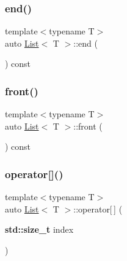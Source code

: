 \mbox{\label{struct_list_a22f91e0dfc7ab053952fc8ed33e5cd53}} 
\subsubsection{\texorpdfstring{end()}{end()}}
{\footnotesize\ttfamily template$<$typename T$>$ \\
auto \hyperlink{struct_list}{List}$<$ T $>$\+::end (\begin{DoxyParamCaption}{ }\end{DoxyParamCaption}) const\hspace{0.3cm}{\ttfamily [inline]}}

\mbox{\label{struct_list_a4efaea597a8cea09cc9e7717e6a9f80a}} 
\subsubsection{\texorpdfstring{front()}{front()}}
{\footnotesize\ttfamily template$<$typename T$>$ \\
auto \hyperlink{struct_list}{List}$<$ T $>$\+::front (\begin{DoxyParamCaption}{ }\end{DoxyParamCaption}) const\hspace{0.3cm}{\ttfamily [inline]}}

\mbox{\label{struct_list_a40b4d77cbee9b7c311c304cafbf07d1e}} 
\subsubsection{\texorpdfstring{operator[]()}{operator[]()}}
{\footnotesize\ttfamily template$<$typename T$>$ \\
auto \hyperlink{struct_list}{List}$<$ T $>$\+::operator\mbox{[}$\,$\mbox{]} (\begin{DoxyParamCaption}\item[{\textbf{ std\+::size\+\_\+t}}]{index }\end{DoxyParamCaption})\hspace{0.3cm}{\ttfamily [inline]}}

\mbox{\label{struct_list_a42e1aee3e26b76b3f4d9386efa7fe8b7}} 
